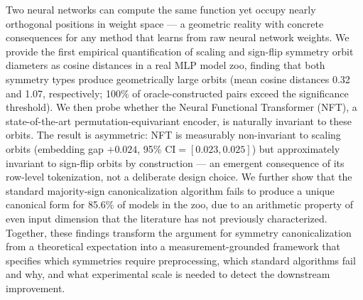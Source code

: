 Two neural networks can compute the same function yet occupy nearly orthogonal positions in weight space --- a geometric reality with concrete consequences for any method that learns from raw neural network weights. We provide the first empirical quantification of scaling and sign-flip symmetry orbit diameters as cosine distances in a real MLP model zoo, finding that both symmetry types produce geometrically large orbits (mean cosine distances 0.32 and 1.07, respectively; 100\% of oracle-constructed pairs exceed the significance threshold). We then probe whether the Neural Functional Transformer (NFT), a state-of-the-art permutation-equivariant encoder, is naturally invariant to these orbits. The result is asymmetric: NFT is measurably non-invariant to scaling orbits (embedding gap $+0.024$, 95\% CI$=[0.023, 0.025]$) but approximately invariant to sign-flip orbits by construction --- an emergent consequence of its row-level tokenization, not a deliberate design choice. We further show that the standard majority-sign canonicalization algorithm fails to produce a unique canonical form for 85.6\% of models in the zoo, due to an arithmetic property of even input dimension that the literature has not previously characterized. Together, these findings transform the argument for symmetry canonicalization from a theoretical expectation into a measurement-grounded framework that specifies which symmetries require preprocessing, which standard algorithms fail and why, and what experimental scale is needed to detect the downstream improvement.
